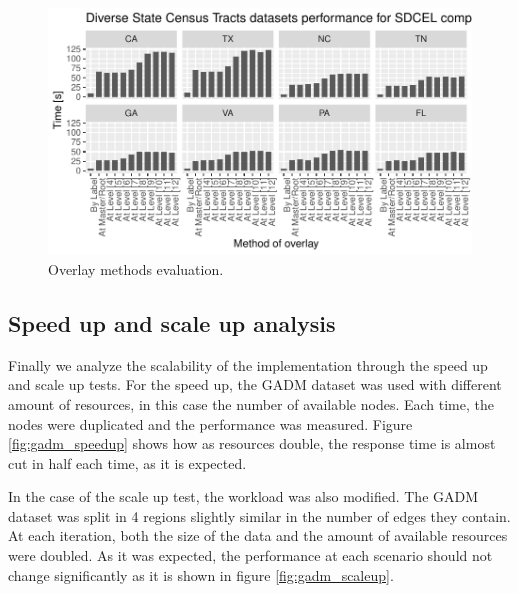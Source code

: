 \begin{figure}[!ht]
    \centering
    \includegraphics[width=\linewidth]{figures/experiments/Overlay_Tester}
    \caption{Overlay methods evaluation.}\label{fig:overlay_tester}
\end{figure}


\subsection{Speed up and scale up analysis}

Finally we analyze the scalability of the implementation through the speed up and scale up tests.  For the speed up, the GADM dataset was used with different amount of resources, in this case the number of available nodes.  Each time, the nodes were duplicated and the performance was measured.  Figure \ref{fig:gadm_speedup} shows  how as resources double, the response time is almost cut in half each time, as it is expected.

In the case of the scale up test, the workload was also modified.  The GADM dataset was split in 4 regions slightly similar in the number of edges they contain.  At each iteration, both the size of the data and the amount of available resources were doubled. As it was expected, the performance at each scenario should not change significantly as it is shown in figure \ref{fig:gadm_scaleup}.

